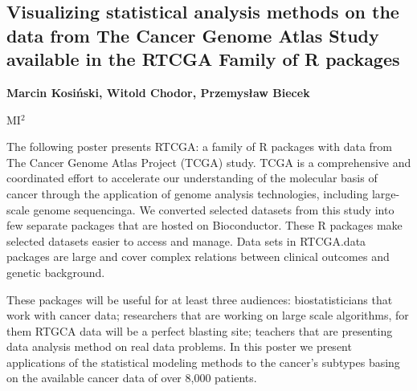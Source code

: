 \documentclass[\main/boa.tex]{subfiles}
\begin{document}
\subsection{Visualizing statistical analysis methods on the data from The Cancer Genome Atlas Study available in the RTCGA Family of R packages}

\begin{minipage}{0.915\textwidth}
\centering
{\bf {}  Marcin Kosiński,   Witold Chodor,   Przemysław Biecek}
\end{minipage}


\begin{affiliations}
\begin{minipage}{0.915\textwidth}
\centering
MI$^{2}$   \\[-2pt]
\end{minipage}
\end{affiliations}

\vskip 0.3cm

The following poster presents RTCGA: a family of R packages with data from The Cancer Genome Atlas Project (TCGA) study. TCGA is a comprehensive and coordinated effort to accelerate our understanding of the
molecular basis of cancer through the application of genome analysis technologies, including large-scale genome sequencinga. 
We converted selected datasets from this study into few separate packages that are hosted on Bioconductor.
These R packages make selected datasets easier to access and manage. Data sets in RTCGA.data packages are large and cover complex
relations between clinical outcomes and genetic background.

These packages will be useful for at least three audiences: biostatisticians that work with cancer data; researchers that are working on large scale algorithms, for them RTGCA data will be a perfect blasting site; teachers that are presenting data analysis method on real data problems. In this poster we present applications of the statistical modeling methods to the cancer’s subtypes basing on the available cancer data of over 8,000 patients.
\end{document}
